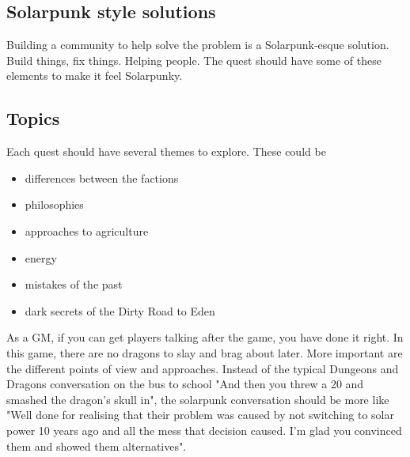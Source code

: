 \subsection{Solarpunk style solutions}

Building a community to help solve the problem is a Solarpunk-esque solution. Build things, fix things. Helping people. The quest should have some of these elements to make it feel Solarpunky.

\subsection{Topics}

Each quest should have several themes to explore. These could be
\begin{itemize}
    \item differences between the factions
    \item philosophies
    \item approaches to agriculture
    \item energy
    \item mistakes of the past
    \item dark secrets of the Dirty Road to Eden
\end{itemize}

As a GM, if you can get players talking after the game, you have done it right. In this game, there are no dragons to slay and brag about later. More important are the different points of view and approaches. Instead of the typical Dungeons and Dragons conversation on the bus to school "And then you threw a 20 and smashed the dragon's skull in", the solarpunk conversation should be more like "Well done for realising that their problem was caused by not switching to solar power 10 years ago and all the mess that decision caused. I'm glad you convinced them and showed them alternatives".